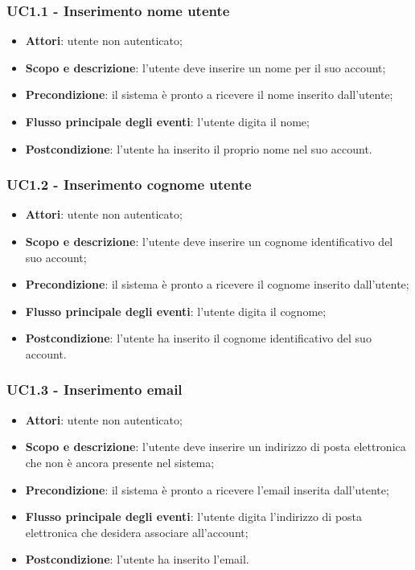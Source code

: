 \subsubsection{UC1.1 - Inserimento nome utente}
\begin{itemize}
\item \textbf{Attori}: utente non autenticato;
\item \textbf{Scopo e descrizione}: l’utente deve inserire un nome per il suo account;
\item \textbf{Precondizione}: il sistema è pronto a ricevere il nome inserito dall’utente;
\item \textbf{Flusso principale degli eventi}: l’utente digita il nome;
\item \textbf{Postcondizione}: l’utente ha inserito il proprio nome nel suo account.
\end{itemize}

\subsubsection{UC1.2 - Inserimento cognome utente}
\begin{itemize}
	\item \textbf{Attori}: utente non autenticato;
	\item \textbf{Scopo e descrizione}: l’utente deve inserire un cognome identificativo del suo account;
	\item \textbf{Precondizione}: il sistema è pronto a ricevere il cognome inserito dall’utente;
	\item \textbf{Flusso principale degli eventi}: l’utente digita il cognome;
	\item \textbf{Postcondizione}: l’utente ha inserito il cognome identificativo del suo account.
\end{itemize}
\subsubsection{UC1.3 - Inserimento email}
\begin{itemize}
\item \textbf{Attori}: utente non autenticato;
\item \textbf{Scopo e descrizione}: l’utente deve inserire un indirizzo di posta elettronica che non è ancora presente nel sistema;
\item \textbf{Precondizione}: il sistema è pronto a ricevere l’email inserita dall’utente;
\item \textbf{Flusso principale degli eventi}: l’utente digita l’indirizzo di posta elettronica che desidera associare all’account;
\item \textbf{Postcondizione}: l’utente ha inserito l’email.
\end{itemize}
